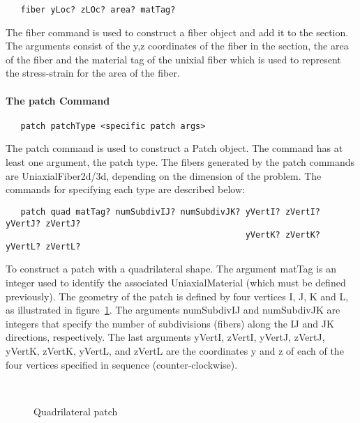 \documentclass[12pt]{article}
\begin{document}
{\sf\small
\begin{verbatim}
   fiber yLoc? zLOc? area? matTag?
\end{verbatim}
}

The fiber command is used to construct a fiber object and add it to
the section. The arguments consist of the y,z coordinates of the fiber
in the section, the area of the fiber and the material tag of the
unixial fiber which is used to represent the stress-strain for the
area of the fiber.

\paragraph{The patch Command}

{\sf\small
\begin{verbatim}
   patch patchType <specific patch args>
\end{verbatim}
}

The patch command is used to construct a Patch object. 
The command has at least one argument, the patch type. The fibers
generated by the patch commands are UniaxialFiber2d/3d, depending on
the dimension of the problem. The commands
for specifying each type are described below:

{\sf\small
\begin{verbatim}
   patch quad matTag? numSubdivIJ? numSubdivJK? yVertI? zVertI? yVertJ? zVertJ? 
                                                yVertK? zVertK? yVertL? zVertL?

\end{verbatim}
}

\noindent To construct a patch with a quadrilateral shape. The
argument matTag is an integer used to identify the associated
UniaxialMaterial (which must be defined previously). The geometry of 
the patch is defined by four vertices I, J, K and L, as illustrated
in figure~\ref{quadPatch}. The arguments numSubdivIJ and numSubdivJK are integers
that specify the number of subdivisions (fibers) along the IJ and JK 
directions, respectively. The last arguments yVertI, zVertI, yVertJ,
zVertJ, yVertK, zVertK, yVertL, and zVertL
are the coordinates y and z of each of the four vertices specified in sequence
(counter-clockwise).
 


\begin{figure}[htpb]
\begin{center}
\leavevmode
\hbox{%
}
\end{center}
\caption{Quadrilateral patch}
\label{quadPatch}
\end{figure}
\end{document}
